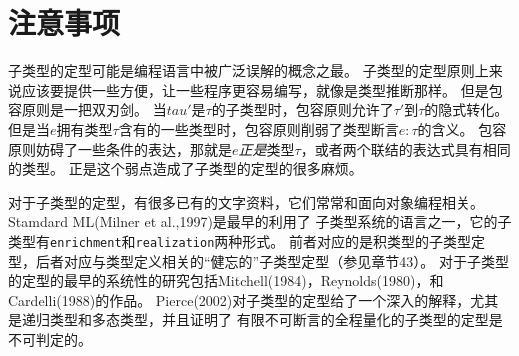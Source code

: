 \section{注意事项}
子类型的定型可能是编程语言中被广泛误解的概念之最。
子类型的定型原则上来说应该要提供一些方便，让一些程序更容易编写，就像是类型推断那样。
但是包容原则是一把双刃剑。
当$tau'$是$\tau$的子类型时，包容原则允许了$\tau'$到$\tau$的隐式转化。
但是当$e$拥有类型$\tau$含有的一些类型时，包容原则削弱了类型断言$e:\tau$的含义。
包容原则妨碍了一些条件的表达，那就是$e$\textit{正是}类型$\tau$，或者两个联结的表达式具有相同的类型。
正是这个弱点造成了子类型的定型的很多麻烦。

对于子类型的定型，有很多已有的文字资料，它们常常和面向对象编程相关。Stamdard ML(Milner et al.,1997)是最早的利用了
子类型系统的语言之一，它的子类型有\texttt{enrichment}和\texttt{realization}两种形式。
前者对应的是积类型的子类型定型，后者对应与类型定义相关的“健忘的”子类型定型（参见章节43）。
对于子类型的定型的最早的系统性的研究包括Mitchell(1984)，Reynolds(1980)，和Cardelli(1988)的作品。
Pierce(2002)对子类型的定型给了一个深入的解释，尤其是递归类型和多态类型，并且证明了
有限不可断言的全程量化的子类型的定型是不可判定的。
